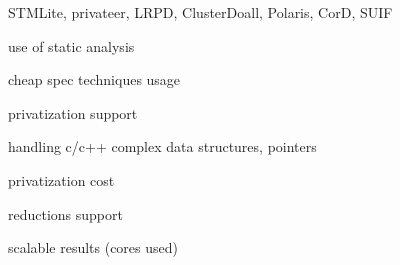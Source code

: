 STMLite, privateer, LRPD, ClusterDoall,
Polaris, CorD, SUIF

use of static analysis

cheap spec techniques usage

privatization support

handling c/c++ complex data structures, pointers

privatization cost

reductions support

scalable results (cores used)


%
%
%
%

